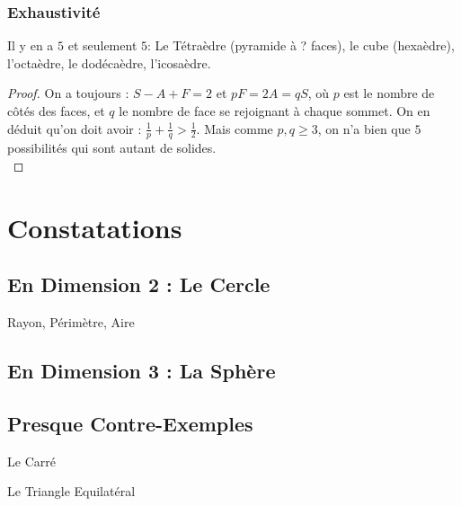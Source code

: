 \documentclass{beamercours}
\begin{document}
            \begin{frame}
                \frametitle{Exhaustivité}
                \begin{theorem}
                    Il y en a $5$ et seulement $5$: Le Tétraèdre (pyramide à ? faces), le cube (hexaèdre), l'octaèdre, le dodécaèdre, l'icosaèdre.
                \end{theorem}
                \begin{proof}
                    On a toujours : $S - A + F = 2$ et $pF = 2A = qS$, où $p$ est le nombre de côtés des faces, et $q$ le nombre de face se rejoignant à chaque sommet. 
                    On en déduit qu'on doit avoir : $\frac{1}{p} + \frac{1}{q} > \frac{1}{2}$. Mais comme $p, q \geq 3$, on n'a bien que $5$ possibilités qui sont autant de solides.\\
                \end{proof}                     
            \end{frame}

    \section{Constatations}
        \subsection{En Dimension 2 : Le Cercle}
            \begin{frame}{Rayon, Périmètre, Aire}

            \end{frame}

        \subsection{En Dimension 3 : La Sphère}

        \subsection{Presque Contre-Exemples}
            \begin{frame}{Le Carré}
                
            \end{frame}

            \begin{frame}{Le Triangle Equilatéral}
                
            \end{frame}
\end{document}
